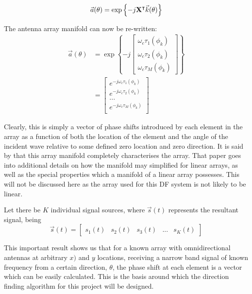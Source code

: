 \begin{equation}
  \vec{a}(\theta) = \exp \left\{ -j \mathbf{X}^\intercal \vec{k}(\theta) \right\}
\end{equation}



The antenna array manifold can now be re-written:
\begin{align}
\vec{a}(\theta) &= 
  \exp \left\{ -j \begin{bmatrix} 
      \omega_c \tau_1(\phi_k)\\ 
      \omega_c \tau_2(\phi_k)\\ 
      \omega_c \tau_M(\phi_k) 
   \end{bmatrix} \right\} \\
  &= \begin{bmatrix}
      e^{-j\omega_c \tau_1(\phi_k)} \\
      e^{-j\omega_c \tau_2(\phi_k)} \\
      ... \\
      e^{-j\omega_c \tau_M(\phi_k)} \\
   \end{bmatrix}
\end{align}

Clearly, this is simply a vector of phase shifts introduced by each element in the array as a function of both the location of the element and the angle of the incident wave relative to some defined zero location and zero direction. It is said by \cite{dacos1995estimating} that this array manifold completely characterises the array. That paper goes into additional details on how the manifold may simplified for linear arrays, as well as the special properties which a manifold of a linear array possesses. This will not be discussed here as the array used for this DF system is not likely to be linear. 

Let there be $K$ individual signal sources, where $\vec{s}(t)$ represents the resultant signal, being
\begin{equation}
\vec{s}(t) = \begin{bmatrix} s_{1}(t) & s_{2}(t) & s_3(t) & ... & s_K(t) \end{bmatrix}
\end{equation}

This important result shows us that for a known array with omnidirectional antennas at arbitrary \(x)\) and \(y\) locations, receiving a narrow band signal of known frequency from a certain direction, \(\theta\), the phase shift at each element is a vector which can be easily calculated. This is the basis around which the direction finding algorithm for this project will be designed. 


